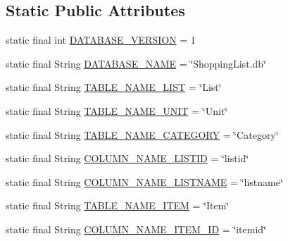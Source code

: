 \subsection*{Static Public Attributes}
\begin{DoxyCompactItemize}
\item 
static final int \hyperlink{classcom_1_1example_1_1santh_1_1shoppinglist_1_1_data_base_manager_a390eab428a5fa43c2a986cc0396800dc}{D\+A\+T\+A\+B\+A\+S\+E\+\_\+\+V\+E\+R\+S\+I\+ON} = 1
\item 
static final String \hyperlink{classcom_1_1example_1_1santh_1_1shoppinglist_1_1_data_base_manager_a715ae8e63c4b8b71d5ee7f84624457b6}{D\+A\+T\+A\+B\+A\+S\+E\+\_\+\+N\+A\+ME} = \char`\"{}Shopping\+List.\+db\char`\"{}
\item 
static final String \hyperlink{classcom_1_1example_1_1santh_1_1shoppinglist_1_1_data_base_manager_a4baaaa98454321bf218711bd5c716dfb}{T\+A\+B\+L\+E\+\_\+\+N\+A\+M\+E\+\_\+\+L\+I\+ST} = \char`\"{}List\char`\"{}
\item 
static final String \hyperlink{classcom_1_1example_1_1santh_1_1shoppinglist_1_1_data_base_manager_a6001c0b58adbe34cf48abe6c06ee2704}{T\+A\+B\+L\+E\+\_\+\+N\+A\+M\+E\+\_\+\+U\+N\+IT} = \char`\"{}Unit\char`\"{}
\item 
static final String \hyperlink{classcom_1_1example_1_1santh_1_1shoppinglist_1_1_data_base_manager_a93a7ddc84d39f7aacf052122683e8dcf}{T\+A\+B\+L\+E\+\_\+\+N\+A\+M\+E\+\_\+\+C\+A\+T\+E\+G\+O\+RY} = \char`\"{}Category\char`\"{}
\item 
static final String \hyperlink{classcom_1_1example_1_1santh_1_1shoppinglist_1_1_data_base_manager_adef1e883e70f7425117fade0cf0e95c0}{C\+O\+L\+U\+M\+N\+\_\+\+N\+A\+M\+E\+\_\+\+L\+I\+S\+T\+ID} = \char`\"{}listid\char`\"{}
\item 
static final String \hyperlink{classcom_1_1example_1_1santh_1_1shoppinglist_1_1_data_base_manager_ac4fd55b0cb41d7cd67ec2e77d916336c}{C\+O\+L\+U\+M\+N\+\_\+\+N\+A\+M\+E\+\_\+\+L\+I\+S\+T\+N\+A\+ME} = \char`\"{}listname\char`\"{}
\item 
static final String \hyperlink{classcom_1_1example_1_1santh_1_1shoppinglist_1_1_data_base_manager_a76d9454b49ce6a5f120990df1e0a4338}{T\+A\+B\+L\+E\+\_\+\+N\+A\+M\+E\+\_\+\+I\+T\+EM} = \char`\"{}Item\char`\"{}
\item 
static final String \hyperlink{classcom_1_1example_1_1santh_1_1shoppinglist_1_1_data_base_manager_a9e8a8e983956f2de8440c37a7a6b378a}{C\+O\+L\+U\+M\+N\+\_\+\+N\+A\+M\+E\+\_\+\+I\+T\+E\+M\+\_\+\+ID} = \char`\"{}itemid\char`\"{}

\end{DoxyCompactItemize}
